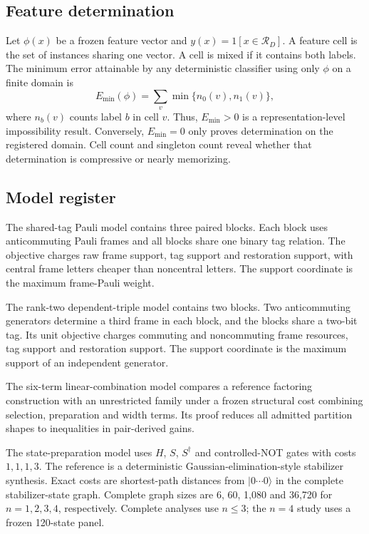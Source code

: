 \subsection{Feature determination}

Let $\phi(x)$ be a frozen feature vector and $y(x)=1[x\in\mathcal{R}_D]$.  A feature cell is the set of instances sharing one vector.  A cell is mixed if it contains both labels.  The minimum error attainable by any deterministic classifier using only $\phi$ on a finite domain is
\begin{equation}
 E_{\min}(\phi)=\sum_v \min\{n_0(v),n_1(v)\},
\end{equation}
where $n_b(v)$ counts label $b$ in cell $v$.  Thus, $E_{\min}>0$ is a representation-level impossibility result.  Conversely, $E_{\min}=0$ only proves determination on the registered domain.  Cell count and singleton count reveal whether that determination is compressive or nearly memorizing.

\subsection{Model register}

The shared-tag Pauli model contains three paired blocks.  Each block uses anticommuting Pauli frames and all blocks share one binary tag relation.  The objective charges raw frame support, tag support and restoration support, with central frame letters cheaper than noncentral letters.  The support coordinate is the maximum frame-Pauli weight.

The rank-two dependent-triple model contains two blocks.  Two anticommuting generators determine a third frame in each block, and the blocks share a two-bit tag.  Its unit objective charges commuting and noncommuting frame resources, tag support and restoration support.  The support coordinate is the maximum support of an independent generator.

The six-term linear-combination model compares a reference factoring construction with an unrestricted family under a frozen structural cost combining selection, preparation and width terms.  Its proof reduces all admitted partition shapes to inequalities in pair-derived gains.

The state-preparation model uses $H$, $S$, $S^\dagger$ and controlled-NOT gates with costs $1,1,1,3$.  The reference is a deterministic Gaussian-elimination-style stabilizer synthesis.  Exact costs are shortest-path distances from $|0\cdots0\rangle$ in the complete stabilizer-state graph.  Complete graph sizes are 6, 60, 1,080 and 36,720 for $n=1,2,3,4$, respectively.  Complete analyses use $n\leq3$; the $n=4$ study uses a frozen 120-state panel.

